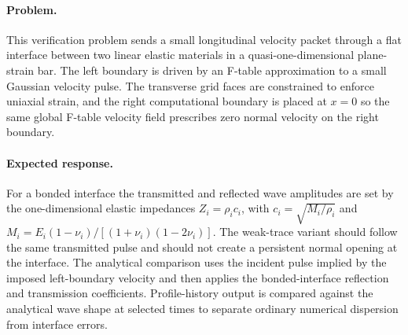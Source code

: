 \paragraph{Problem.}
This verification problem sends a small longitudinal velocity packet through a
flat interface between two linear elastic materials in a quasi-one-dimensional
plane-strain bar.  The left boundary is driven by an F-table approximation to a
small Gaussian velocity pulse.  The transverse grid faces are constrained to
enforce uniaxial strain, and the right computational boundary is placed at
$x=0$ so the same global F-table velocity field prescribes zero normal velocity
on the right boundary.

\paragraph{Expected response.}
For a bonded interface the transmitted and reflected wave amplitudes are set by
the one-dimensional elastic impedances $Z_i=\rho_i c_i$, with
$c_i=\sqrt{M_i/\rho_i}$ and
$M_i=E_i(1-\nu_i)/[(1+\nu_i)(1-2\nu_i)]$.  The weak-trace variant should follow
the same transmitted pulse and should not create a persistent normal opening at
the interface.  The analytical comparison uses the incident pulse implied by
the imposed left-boundary velocity and then applies the bonded-interface
reflection and transmission coefficients.  Profile-history output is compared
against the analytical wave shape at selected times to separate ordinary
numerical dispersion from interface errors.

